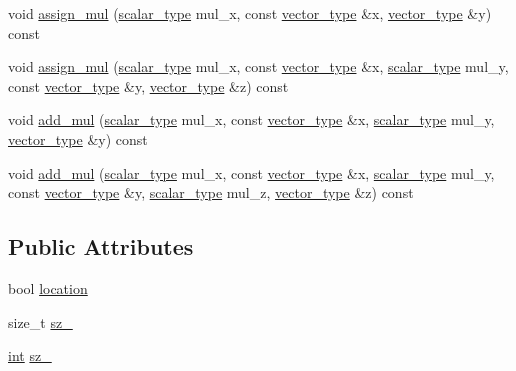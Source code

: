 \begin{DoxyCompactItemize}
\item 
void \hyperlink{structcpu__vector__operations_aa8a06e53a83c6b3b3e3efddcd75065da}{assign\-\_\-mul} (\hyperlink{structcpu__vector__operations_aca6b216aa1fb172df83d98350e94fd61}{scalar\-\_\-type} mul\-\_\-x, const \hyperlink{structcpu__vector__operations_a1962836df596ce262704d208e9a6d8f9}{vector\-\_\-type} \&x, \hyperlink{structcpu__vector__operations_a1962836df596ce262704d208e9a6d8f9}{vector\-\_\-type} \&y) const 
\item 
void \hyperlink{structcpu__vector__operations_a163796b0326ebdd18f2711469783f1a1}{assign\-\_\-mul} (\hyperlink{structcpu__vector__operations_aca6b216aa1fb172df83d98350e94fd61}{scalar\-\_\-type} mul\-\_\-x, const \hyperlink{structcpu__vector__operations_a1962836df596ce262704d208e9a6d8f9}{vector\-\_\-type} \&x, \hyperlink{structcpu__vector__operations_aca6b216aa1fb172df83d98350e94fd61}{scalar\-\_\-type} mul\-\_\-y, const \hyperlink{structcpu__vector__operations_a1962836df596ce262704d208e9a6d8f9}{vector\-\_\-type} \&y, \hyperlink{structcpu__vector__operations_a1962836df596ce262704d208e9a6d8f9}{vector\-\_\-type} \&z) const 
\item 
void \hyperlink{structcpu__vector__operations_a19a2b91881a13f4b4372164aecc3fb67}{add\-\_\-mul} (\hyperlink{structcpu__vector__operations_aca6b216aa1fb172df83d98350e94fd61}{scalar\-\_\-type} mul\-\_\-x, const \hyperlink{structcpu__vector__operations_a1962836df596ce262704d208e9a6d8f9}{vector\-\_\-type} \&x, \hyperlink{structcpu__vector__operations_aca6b216aa1fb172df83d98350e94fd61}{scalar\-\_\-type} mul\-\_\-y, \hyperlink{structcpu__vector__operations_a1962836df596ce262704d208e9a6d8f9}{vector\-\_\-type} \&y) const 
\item 
void \hyperlink{structcpu__vector__operations_a6fa2370a0e2623c5ecc75e149cfda4d7}{add\-\_\-mul} (\hyperlink{structcpu__vector__operations_aca6b216aa1fb172df83d98350e94fd61}{scalar\-\_\-type} mul\-\_\-x, const \hyperlink{structcpu__vector__operations_a1962836df596ce262704d208e9a6d8f9}{vector\-\_\-type} \&x, \hyperlink{structcpu__vector__operations_aca6b216aa1fb172df83d98350e94fd61}{scalar\-\_\-type} mul\-\_\-y, const \hyperlink{structcpu__vector__operations_a1962836df596ce262704d208e9a6d8f9}{vector\-\_\-type} \&y, \hyperlink{structcpu__vector__operations_aca6b216aa1fb172df83d98350e94fd61}{scalar\-\_\-type} mul\-\_\-z, \hyperlink{structcpu__vector__operations_a1962836df596ce262704d208e9a6d8f9}{vector\-\_\-type} \&z) const 
\end{DoxyCompactItemize}
\subsection*{Public Attributes}
\begin{DoxyCompactItemize}
\item 
bool \hyperlink{structcpu__vector__operations_aa9ffb9a3af966d244e00752d0fbf4954}{location}
\item 
size\-\_\-t \hyperlink{structcpu__vector__operations_a2a4bf62b86d243cb5fba381dda5c1e3d}{sz\-\_\-}
\item 
\hyperlink{classint}{int} \hyperlink{structcpu__vector__operations_a2a4bf62b86d243cb5fba381dda5c1e3d}{sz\-\_\-}
\end{DoxyCompactItemize}


